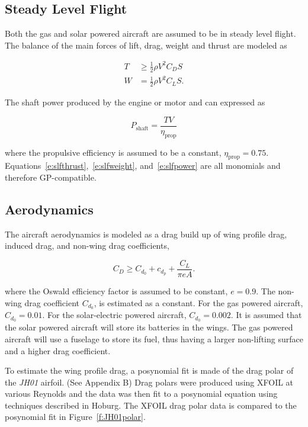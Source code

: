 \documentclass[]{aiaa-tc}%
\begin{document}
\subsection{Steady Level Flight}

Both the gas and solar powered aircraft are assumed to be in steady level flight.  The balance of the main forces of lift, drag, weight and thrust are modeled as\cite{hoburgthesis}

\begin{align}
    \label{e:slfthrust}
    T &\geq \frac{1}{2} \rho V^2 C_D S\\
    \label{e:slfweight}
    W &= \frac{1}{2} \rho V^2 C_L S . 
\end{align}

The shaft power produced by the engine or motor and can expressed as  

\begin{equation}
    \label{e:slfpower}
    P_{\text{shaft}} = \frac{TV}{\eta_{\text{prop}}}
    \end{equation}

    where the propulsive efficiency is assumed to be a constant, $\eta_{\text{prop}} = 0.75$. Equations~\eqref{e:slfthrust},~\eqref{e:slfweight}, and~\eqref{e:slfpower} are all monomials and therefore GP-compatible.

\subsection{Aerodynamics}

The aircraft aerodynamics is modeled as a drag build up of wing profile drag, induced drag, and non-wing drag coefficients, 

\begin{equation}
    \label{e:aerodragb}
    C_D \geq C_{d_0} + c_{d_p} + \frac{C_L}{\pi e A}.
    \end{equation}

where the Oswald efficiency factor is assumed to be constant, $e=0.9$. 
The non-wing drag coefficient $C_{d_0}$, is estimated as a constant.  
For the gas powered aircraft, $C_{d_0} = 0.01$.  
For the solar-electric powered aircraft, $C_{d_0} = 0.002$.  
It is assumed that the solar powered aircraft will store its batteries in the wings. 
The gas powered aircraft will use a fuselage to store its fuel, thus having a larger non-lifting surface and a higher drag coefficient.\cite{raymer}
    
    To estimate the wing profile drag, a posynomial fit is made of the drag polar of the \emph{JH01} airfoil. (See Appendix B) 
    Drag polars were produced using XFOIL at various Reynolds and the data was then fit to a posynomial equation using techniques described in Hoburg.\cite{fitting}
    The XFOIL drag polar data is compared to the posynomial fit in Figure~\ref{f:JH01polar}.
\end{document}
